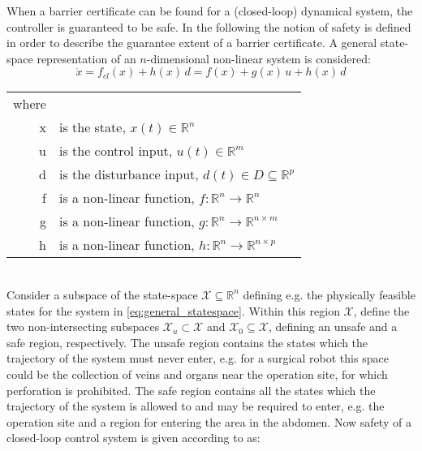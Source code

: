 When a barrier certificate can be found for a (closed-loop) dynamical system, the controller is guaranteed to be safe. In the following the notion of safety is defined in order to describe the guarantee extent of a barrier certificate. A general state-space representation of an $n$-dimensional non-linear system is considered:
\begin{equation}
\dot{x} = f_{cl}(x) + h(x)\,d = f(x) + g(x)\,u + h(x)\,d
\label{eq:general_statespace}
\end{equation}
\begin{tabular}{rl} 
where &  \\
\gls{x} &  is the state, $x(t) \in \mathbb{R}^n$\\
\gls{u} & is the control input, $u(t) \in \mathbb{R}^m$\\
\gls{d} & is the disturbance input, $d(t) \in D \subseteq \mathbb{R}^p$ \\
\gls{f} & is a non-linear function, $f:\mathbb{R}^n \rightarrow \mathbb{R}^n$\\
\gls{g} & is a non-linear function, $g:\mathbb{R}^n \rightarrow \mathbb{R}^{n \times m}$\\
\gls{h} & is a non-linear function, $h:\mathbb{R}^n \rightarrow \mathbb{R}^{n \times p}$
\end{tabular}\\

Consider a subspace of the state-space $\mathcal{X}\subseteq\mathbb{R}^n$ defining e.g. the physically feasible states for the system in \autoref{eq:general_statespace}. Within this region $\mathcal{X}$, define the two non-intersecting subspaces $\mathcal{X}_u\subset\mathcal{X}$ and $\mathcal{X}_0\subseteq\mathcal{X}$, defining an unsafe  and a safe region, respectively. The unsafe region contains the states which the trajectory of the system must never enter, e.g. for a surgical robot this space could be the collection of veins and organs near the operation site, for which perforation is prohibited. The safe region contains all the states which the trajectory of the system is allowed to and may be required to enter, e.g. the operation site and a region for entering the area in the abdomen.
Now safety of a closed-loop control system is given according to \citep{bib:safety,bib:barrier_prajna} as:

